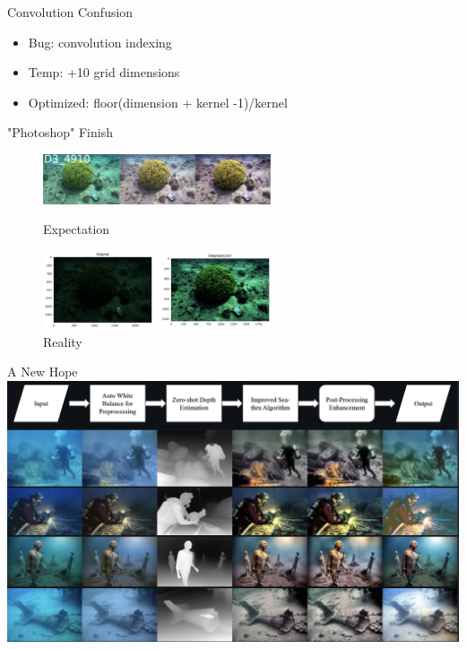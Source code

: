 \begin{frame}{Convolution Confusion}
    \begin{itemize}
        \item Bug: convolution indexing
        \item Temp: +10 grid dimensions
        \item Optimized: floor(dimension + kernel -1)/kernel
    \end{itemize}    
\end{frame}

\begin{frame}{"Photoshop" Finish}
    \centering
    \begin{figure}
        \includegraphics[height=0.5\textheight,width=0.6\textwidth,keepaspectratio]{images/expectation.png}
        \caption{Expectation}

        \vspace{1em}

        \includegraphics[height=0.5\textheight,width=0.6\textwidth,keepaspectratio]{images/reality.png}
        \caption{Reality}
        
    \end{figure}
\end{frame}

\begin{frame}{A New Hope}
    \hspace*{0.025\textwidth}  %
    \includegraphics[height=0.8\textheight,keepaspectratio]{images/hope.png}
\end{frame}

